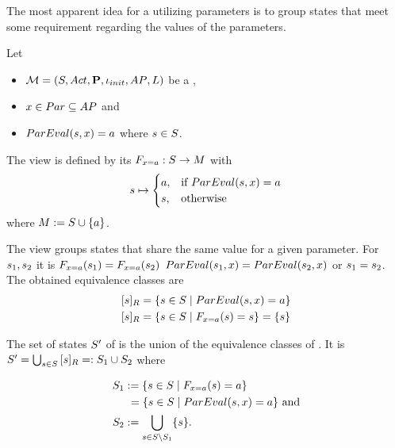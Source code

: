 \documentclass[preview]{standalone}
\begin{document}
The most apparent idea for a \viewN utilizing parameters is to group states that meet some requirement regarding the values of the parameters.



\begin{definition}
	Let
	\begin{itemize}
		\item ${{{\mathcal{M}}}} = {{({S}, {Act}, {\textbf{P}}, {\iota_{init}}, {AP}, {L})}}$ be a \chosengraphtypeN,
		\item ${x} \in {Par} \subseteq {AP}$ and 
		\item ${ParEval}({s}, {x}) = {a}$ where ${s} \in {S}$.		
	\end{itemize} 
	The view \viewparamvalueseq is defined by its \grpfctN ${{{F}}_{{x} = {a}}} : {S} \to {\ensuremath{{M}}}$ with
	\[
	{s} \mapsto
	\begin{cases}
		{a}, &\text{if } {ParEval}({s}, {x}) = {a}\\
		{s}, 	&\text{otherwise}
	\end{cases}
	\]
	where ${{M}} := {S} \cup \{a\}$.
\end{definition}

The view \viewparamvalueseq groups states that share the same value for a given parameter. For ${s}_1, {s}_2$ it is ${{{F}}_{{x} = {a}}}({s}_1) = {{{F}}_{{x} = {a}}}({s}_2)$ \iffN ${ParEval}({s}_1, {x}) = {ParEval}({s}_2, {x})$ or ${s}_1 = {s}_2$. The obtained equivalence classes are
\begin{align*}
	\eqclassv{\state} &= \{\state \in \states \mid \parameval(\state, \param) = \paramval\} \\
	\eqclassv{\state} &= \{\state \in \states \mid \gfctparamvalueseq(\state) = \state\} = \{\state\}
\end{align*}

The set of states ${S}'$ of \viewparamvalueseq is the union of the equivalence classes of \eqrelview. It is ${S}' = \bigcup_{{s} \in {S}} {{[{s}]_{{R}}}} =: {S}_1 \cup {S}_2$ where

\begin{align*}
	\states_1 &:= \{\state \in \states \mid \gfctparamvalueseq(\state) = \paramval\} \\
	&\hspace{1.15mm}= \{\state \in \states  \mid \parameval(\state, \param) = \paramval\} \text{ and} \\
	\states_2 &:= \remstates.
\end{align*}
\end{document}
